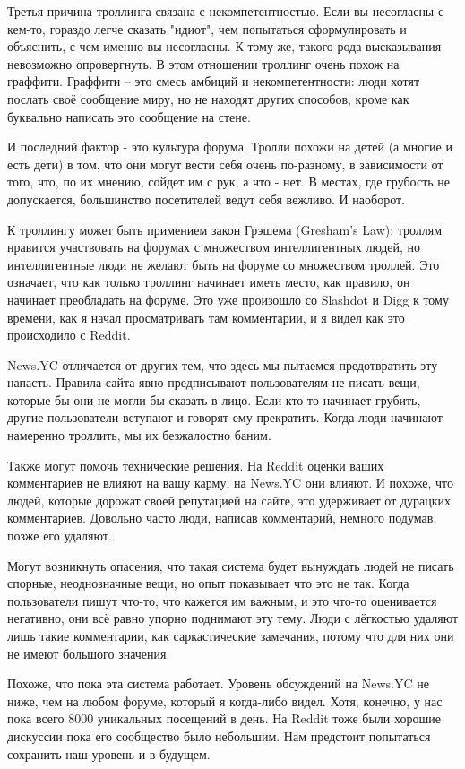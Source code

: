 \documentclass[ebook,12pt,oneside,openany]{memoir}
\begin{document}
Третья причина троллинга связана с некомпетентностью. Если вы
несогласны с кем-то, гораздо легче сказать "идиот", чем попытаться
сформулировать и объяснить, с чем именно вы несогласны. К тому же,
такого рода высказывания невозможно опровергнуть. В этом отношении
троллинг очень похож на граффити. Граффити -- это смесь амбиций и
некомпетентности: люди хотят послать своё сообщение миру, но не
находят других способов, кроме как буквально написать это сообщение на
стене.

И последний фактор - это культура форума. Тролли похожи на детей (а
многие и есть дети) в том, что они могут вести себя очень по-разному,
в зависимости от того, что, по их мнению, сойдет им с рук, а что -
нет. В местах, где грубость не допускается, большинство посетителей
ведут себя вежливо. И наоборот.

К троллингу может быть примением закон Грэшема (Gresham's Law):
троллям нравится участвовать на форумах с множеством интеллигентных
людей, но интеллигентные люди не желают быть на форуме со множеством
троллей. Это означает, что как только троллинг начинает иметь место,
как правило, он начинает преобладать на форуме. Это уже произошло со
Slashdot и Digg к тому времени, как я начал просматривать там
комментарии, и я видел как это происходило с Reddit.

News.YC отличается от других тем, что здесь мы пытаемся предотвратить
эту напасть. Правила сайта явно предписывают пользователям не писать
вещи, которые бы они не могли бы сказать в лицо. Если кто-то начинает
грубить, другие пользователи вступают и говорят ему прекратить. Когда
люди начинают намеренно троллить, мы их безжалостно баним.

Также могут помочь технические решения. На Reddit оценки ваших
комментариев не влияют на вашу карму, на News.YC они влияют. И похоже,
что людей, которые дорожат своей репутацией на сайте, это удерживает
от дурацких комментариев. Довольно часто люди, написав комментарий,
немного подумав, позже его удаляют.

Могут возникнуть опасения, что такая система будет вынуждать людей не
писать спорные, неоднозначные вещи, но опыт показывает что это не так.
Когда пользователи пишут что-то, что кажется им важным, и это что-то
оценивается негативно, они всё равно упорно поднимают эту тему. Люди с
лёгкостью удаляют лишь такие комментарии, как саркастические
замечания, потому что для них они не имеют большого значения.

Похоже, что пока эта система работает. Уровень обсуждений на News.YC
не ниже, чем на любом форуме, который я когда-либо видел. Хотя,
конечно, у нас пока всего 8000 уникальных посещений в день. На Reddit
тоже были хорошие дискуссии пока его сообщество было небольшим. Нам
предстоит попытаться сохранить наш уровень и в будущем.
\end{document}

